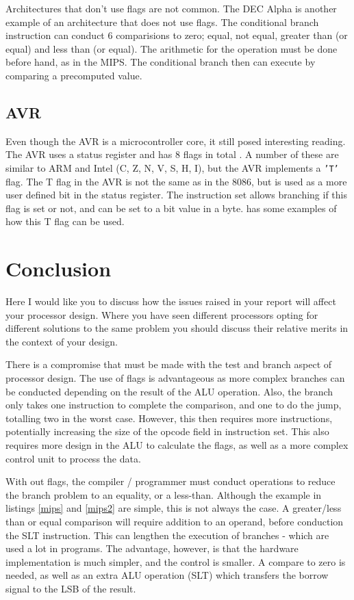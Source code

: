 \documentclass[12pt,a4paper]{article}
\begin{document}
\begin{bibunit}[is-unsrt]
Architectures that don't use flags are not common. 
The DEC Alpha is another example of an architecture that does not use flags.
The conditional branch instruction can conduct 6 comparisions to zero; equal, not equal, greater than (or equal) and less than (or equal).
The arithmetic for the operation must be done before hand, as in the MIPS.
The conditional branch then can execute by comparing a precomputed value. 


\subsection{AVR}
Even though the AVR is a microcontroller core, it still posed interesting reading. 
The AVR uses a status register and has 8 flags in total \cite{atmel:instructions}.
A number of these are similar to ARM and Intel (C, Z, N, V, S, H, I), but the AVR implements a \texttt{'T'} flag.
The T flag in the AVR is not the same as in the 8086, but is used as a more user defined bit in the status register.
The instruction set allows branching if this flag is set or not, and can be set to a bit value in a byte. 
\cite{avr:asm} has some examples of how this T flag can be used.


\section{Conclusion}
Here I would like you to discuss how the issues raised in your report will affect your processor design. Where you have seen different processors opting for different solutions to the same problem you should discuss their relative merits in the context of your design. 

There is a compromise that must be made with the test and branch aspect of processor design.
The use of flags is advantageous as more complex branches can be conducted depending on the result of the ALU operation.
Also, the branch only takes one instruction to complete the comparison, and one to do the jump, totalling two in the worst case.
However, this then requires more instructions, potentially increasing the size of the opcode field in instruction set.
This also requires more design in the ALU to calculate the flags, as well as a more complex control unit to process the data.

With out flags, the compiler / programmer must conduct operations to reduce the branch problem to an equality, or a less-than. 
Although the example in listings \ref{mips} and \ref{mips2} are simple, this is not always the case. 
A greater/less than or equal comparison will require addition to an operand, before conduction the SLT instruction.
This can lengthen the execution of branches - which are used a lot in programs.
The advantage, however, is that the hardware implementation is much simpler, and the control is smaller.
A compare to zero is needed, as well as an extra ALU operation (SLT) which transfers the borrow signal to the LSB of the result. 


\end{bibunit}
\end{document}
